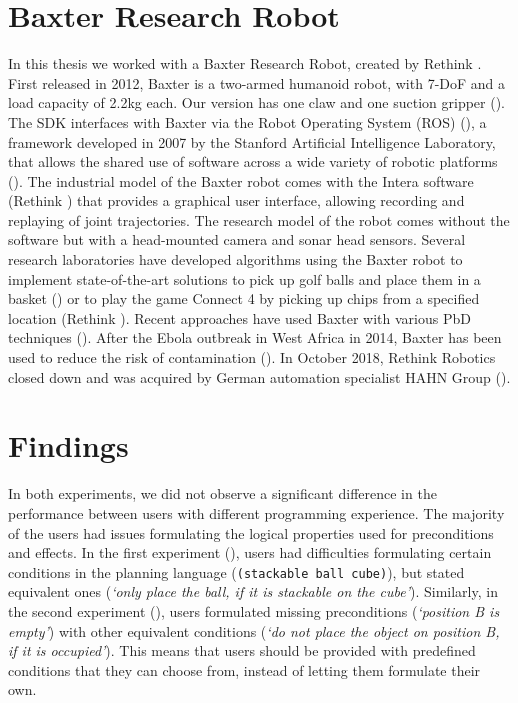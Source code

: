 \section{Baxter Research Robot}\label{sec:baxter}
In this thesis we worked with a Baxter Research Robot, created by Rethink \cite{robotics2013baxter}.
First released in 2012, Baxter is a two-armed humanoid robot, with 7-DoF and a load capacity of 2.2kg each.
Our version has one claw and one suction gripper ().
The SDK interfaces with Baxter via the Robot Operating System (ROS) (\cite{quigley2009ros}), a framework developed in 2007 by the Stanford Artificial Intelligence Laboratory, that allows the shared use of software across a wide variety of robotic platforms (\cite{fernandez2015learning}).
The industrial model of the Baxter robot comes with the Intera software (Rethink \cite{intera}) that provides a graphical user interface, allowing recording and replaying of joint trajectories.
The research model of the robot comes without the software but with a head-mounted camera and sonar head sensors.
Several research laboratories have developed algorithms using the Baxter robot to implement state-of-the-art solutions \eg
to pick up golf balls and place them in a basket (\cite{BaxterGolf}) or to play the game Connect 4 by picking up chips from a specified location (Rethink \cite{Connect4}). 
Recent approaches have used Baxter with various PbD techniques (\cite{tremblay2018synthetically,yang2016development,li2017neural}).
After the Ebola outbreak in West Africa in 2014, Baxter has been used to reduce the risk of contamination (\cite{Ebola}).
In October 2018, Rethink Robotics closed down and was acquired by German automation specialist HAHN Group (\cite{rethink2018acquired}).





%

\section{Findings}
In both experiments, we did not observe a significant difference in the performance between users with different programming experience. 
The majority of the users had issues formulating the logical properties used for preconditions and effects. 
In the first experiment (), users had difficulties formulating certain conditions in the planning language (\eg \texttt{(stackable ball cube)}), but stated equivalent ones (\eg \textit{`only place the ball, if it is stackable on the cube'}).
Similarly, in the second experiment (), users formulated missing preconditions (\eg \textit{`position B is empty'}) with other equivalent conditions (\eg \textit{`do not place the object on position B, if it is occupied'}). 
This means that users should be provided with predefined conditions that they can choose from, instead of letting them formulate their own.

